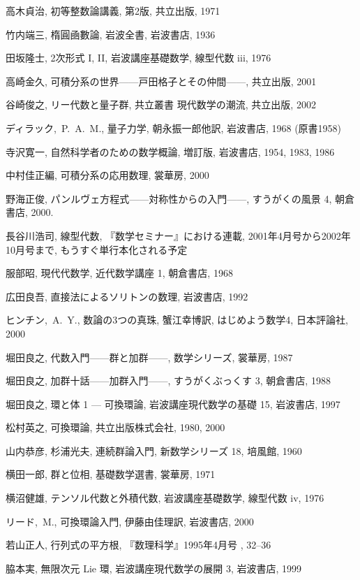\documentclass[12pt,twoside]{jarticle}
\begin{document}
\begin{thebibliography}{ABCD}
高木貞治, 初等整数論講義, 第2版, 共立出版, 1971

竹内端三, 楕圓凾數論, 岩波全書, 岩波書店, 1936

田坂隆士, 2次形式 I, II, 岩波講座基礎数学, 線型代数 iii, 1976

高崎金久, 可積分系の世界——戸田格子とその仲間——, 共立出版, 2001

谷崎俊之, リー代数と量子群, 共立叢書 現代数学の潮流, 共立出版, 2002

ディラック,~P.~A.~M., 量子力学, %
朝永振一郎他訳, 岩波書店, 1968 (原書1958)

寺沢寛一, 自然科学者のための数学概論, 増訂版, 岩波書店, 1954, 1983, 1986

中村佳正編, 可積分系の応用数理, 裳華房, 2000

野海正俊, パンルヴェ方程式——対称性からの入門——, 
すうがくの風景 4, 朝倉書店, 2000.

長谷川浩司, 線型代数, 『数学セミナー』における連載, 
2001年4月号から2002年10月号まで,
もうすぐ単行本化される予定

服部昭, 現代代数学, 近代数学講座 1, 朝倉書店, 1968

広田良吾, 直接法によるソリトンの数理, 岩波書店, 1992

ヒンチン,~A.~Y., 数論の3つの真珠, 蟹江幸博訳, はじめよう数学4, 日本評論社, 
2000

堀田良之, 代数入門——群と加群——, 数学シリーズ, 裳華房, 1987

堀田良之, 加群十話——加群入門——, すうがくぶっくす 3, 朝倉書店, 1988

堀田良之, 環と体 1 --- 可換環論, 岩波講座現代数学の基礎 15, 岩波書店, 1997

松村英之, 可換環論, 共立出版株式会社, 1980, 2000

山内恭彦, 杉浦光夫, 連続群論入門, 新数学シリーズ 18, 培風館, 1960

横田一郎, 群と位相, 基礎数学選書, 裳華房, 1971

横沼健雄, テンソル代数と外積代数, 岩波講座基礎数学, 線型代数 iv, 1976

リード,~M., 可換環論入門, 伊藤由佳理訳, 岩波書店, 2000

若山正人, 行列式の平方根, 『数理科学』1995年4月号 \cite{det-evo}, 32--36

脇本実, 無限次元 Lie 環, 岩波講座現代数学の展開 3, 岩波書店, 1999

\end{thebibliography}

\end{document}
